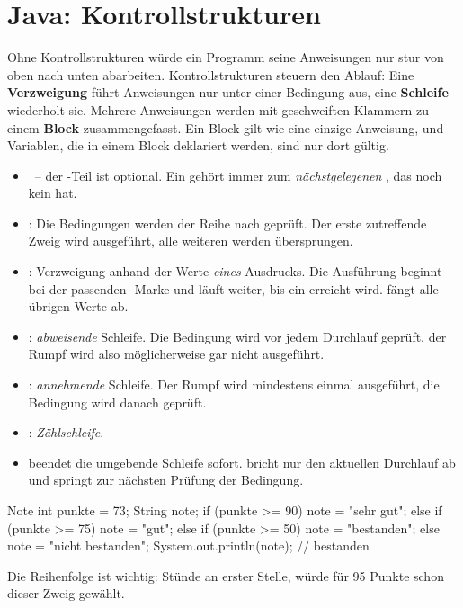 \section{Java: Kontrollstrukturen}
\worum
Ohne Kontrollstrukturen würde ein Programm seine Anweisungen nur stur von oben nach unten abarbeiten. Kontrollstrukturen steuern den Ablauf: Eine \textbf{Verzweigung} führt Anweisungen nur unter einer Bedingung aus, eine \textbf{Schleife} wiederholt sie. Mehrere Anweisungen werden mit geschweiften Klammern zu einem \textbf{Block} zusammengefasst. Ein Block gilt wie eine einzige Anweisung, und Variablen, die in einem Block deklariert werden, sind nur dort gültig.

\begin{merke}
\begin{itemize}[itemsep=0.1em]
\item {} \ -- der -Teil ist optional. Ein  gehört immer zum \emph{nächstgelegenen} , das noch kein  hat.
\item {}: Die Bedingungen werden der Reihe nach geprüft. Der erste zutreffende Zweig wird ausgeführt, alle weiteren werden übersprungen.
\item {}: Verzweigung anhand der Werte \emph{eines} Ausdrucks. Die Ausführung beginnt bei der passenden -Marke und läuft weiter, bis ein  erreicht wird.  fängt alle übrigen Werte ab.
\item {}: \emph{abweisende} Schleife. Die Bedingung wird vor jedem Durchlauf geprüft, der Rumpf wird also möglicherweise gar nicht ausgeführt.
\item {}: \emph{annehmende} Schleife. Der Rumpf wird mindestens einmal ausgeführt, die Bedingung wird danach geprüft.
\item {}: \emph{Zählschleife}.
\item {} beendet die umgebende Schleife sofort.  bricht nur den aktuellen Durchlauf ab und springt zur nächsten Prüfung der Bedingung.
\end{itemize}
\end{merke}

\beispiele
{}
\begin{javacode}[Ausschnitt]{Note}
int punkte = 73;
String note;
if (punkte >= 90) {
	note = "sehr gut";
} else if (punkte >= 75) {
	note = "gut";
} else if (punkte >= 50) {
	note = "bestanden";
} else {
	note = "nicht bestanden";
}
System.out.println(note);       // bestanden
\end{javacode}
Die Reihenfolge ist wichtig: Stünde  an erster Stelle, würde für 95 Punkte schon dieser Zweig gewählt.

